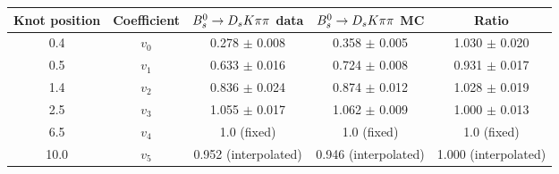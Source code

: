 \begin{tabular}{c c c c c}
\hline
\hline
Knot position & Coefficient & ${{B}^0_{s}}\rightarrow{\ensuremath{{D}_{s}}}{\ensuremath{K}}{\ensuremath{\pi}}{\ensuremath{\pi}}$ data & ${{B}^0_{s}}\rightarrow{\ensuremath{{D}_{s}}}{\ensuremath{K}}{\ensuremath{\pi}}{\ensuremath{\pi}}$ MC & Ratio \\
\hline
0.4 & $v_{0}$ & 0.278 $\pm$ 0.008 & 0.358 $\pm$ 0.005 & 1.030 $\pm$ 0.020\\
0.5 & $v_{1}$ & 0.633 $\pm$ 0.016 & 0.724 $\pm$ 0.008 & 0.931 $\pm$ 0.017\\
1.4 & $v_{2}$ & 0.836 $\pm$ 0.024 & 0.874 $\pm$ 0.012 & 1.028 $\pm$ 0.019\\
2.5 & $v_{3}$ & 1.055 $\pm$ 0.017 & 1.062 $\pm$ 0.009 & 1.000 $\pm$ 0.013\\
6.5 & $v_{4}$ &  1.0 (fixed) & 1.0 (fixed) & 1.0 (fixed)\\
10.0 & $v_{5}$ & 0.952 (interpolated) & 0.946 (interpolated) & 1.000 (interpolated) \\
\hline
\hline
\end{tabular}
